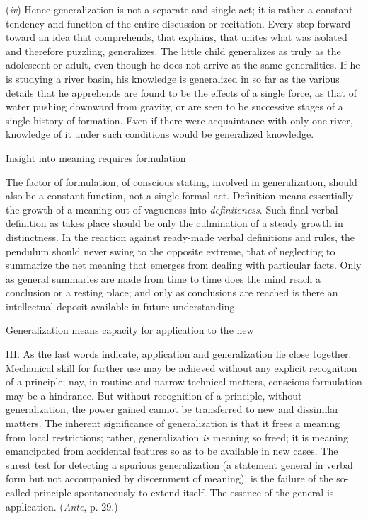 \documentclass[letterpaper]{book}
\begin{document}
(\emph{iv}) Hence generalization is not a separate and single act; it is
rather a constant tendency and function of the entire discussion or
recitation. Every step forward toward an idea that comprehends, that
explains, that unites what was isolated and therefore puzzling,
generalizes. The little child generalizes as truly as the adolescent or
adult, even though he does not arrive at the same generalities. If he is
studying a river basin, his knowledge is generalized in so far as the
various details that he apprehends are found to be the effects of a
single force, as that of water pushing downward from gravity, or are
seen to be successive stages of a single history of formation. Even if
there were acquaintance with only one river, knowledge of it under such
conditions would be generalized
knowledge.

Insight into meaning requires formulation

The factor of formulation, of conscious stating, involved in
generalization, should also be a constant function, not a single formal
act. Definition means essentially the growth of a meaning out of
vagueness into \emph{definiteness}. Such final verbal definition as
takes place should be only the culmination of a steady growth in
distinctness. In the reaction against ready-made verbal definitions and
rules, the pendulum should never swing to the opposite extreme, that of
neglecting to summarize the net meaning that emerges from dealing with
particular facts. Only as general summaries are made from time to time
does the mind reach a conclusion or a resting place; and only as
conclusions are reached is there an intellectual deposit available in
future understanding.

Generalization means capacity for application to the new

III. As the last words indicate, application and generalization lie
close together. Mechanical skill for further use may be achieved without
any explicit recognition of a principle; nay, in routine and narrow
technical matters, conscious formulation may be a hindrance. But without
recognition of a principle, without generalization, the power gained
cannot be transferred to new and dissimilar matters. The inherent
significance of generalization is that it frees a meaning from local
restrictions; rather, generalization \emph{is} meaning so freed; it is
meaning emancipated from accidental features so as to be available in
new cases. The surest test for detecting a spurious generalization (a
statement general in verbal form but not accompanied by discernment of
meaning), is the failure of the so-called principle spontaneously to
extend itself. The essence of the general is application. (\emph{Ante},
p. 29.)
\end{document}
